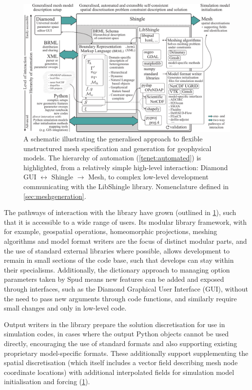 \documentclass[a4paper, 10pt]{book}
\providecommand{\libshingle}{LibShingle\xspace}
\begin{document}
%
\begin{figure}[!h]
\begin{center}
\includegraphics[width=\textwidth]{fig/process.pdf}
\end{center}
\caption{%
A schematic illustrating the generalised approach to flexible unstructured mesh specification and generation for geophysical models.
%
The hierarchy of automation (\cref{tenet:automated}) is highlighted, from
a relatively simple high-level interaction:
{Diamond GUI $\leftrightarrow$ Shingle $\rightarrow$ Mesh},
to complex low-level development communicating with the \libshingle library.
Nomenclature defined in \cref{sec:meshgeneration}.
% 
}
\label{fig:process}
\end{figure}
%

The pathways of interaction with the library have grown
% 
(outlined in \cref{fig:process}),
such that it is accessible to a wide range of users.
Its modular library framework, with for example,
geospatial operations, homeomorphic projections, meshing algorithms and model format writers
are the focus of distinct modular parts,
and the use of standard external libraries where possible,
allows development to remain in small sections of the code base,
such that develops can stay within their specialisms.
Additionally, the dictionary approach to managing option parameters taken by Spud means new features can be added and exposed through interfaces, such as the Diamond Graphical User Interface (GUI), without the need to pass new arguments through code functions,
and similarly require small changes and only in low-level code.

Output writers in the library prepare the solution discretisation for use in simulation codes,
in cases where the output Python objects cannot be used directly,
encouraging the use of standard formats
and also supporting existing proprietary model-specific formats.
% 
These additionally support supplementing the spatial discretisation
(which itself includes a vector field describing mesh node coordinate locations)
with additional interpolated fields for simulation model initialisation and forcing
(\cref{fig:process}).
\end{document}
